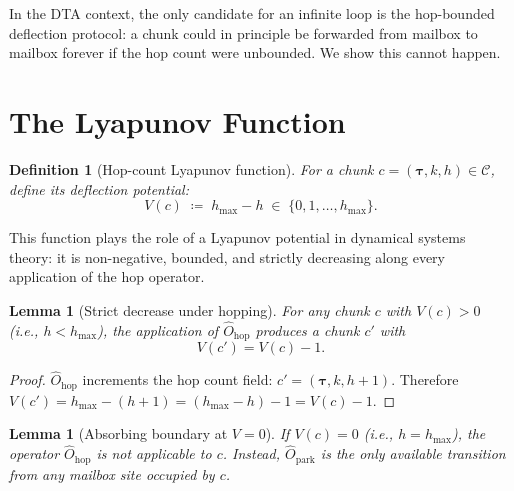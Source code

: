 \documentclass[11pt,a4paper]{report}
\newtheorem{lemma}[theorem]{Lemma}
\newtheorem{definition}{Definition}[section]
\begin{document}
In the DTA context, the only candidate for an infinite loop is the
hop-bounded deflection protocol: a chunk could in principle be
forwarded from mailbox to mailbox forever if the hop count were
unbounded.  We show this cannot happen.

\section{The Lyapunov Function}

\begin{definition}[Hop-count Lyapunov function]
\label{def:lyapunov}
For a chunk $c = (\bm{\tau}, k, h) \in \mathcal{C}$, define its
\emph{deflection potential}:
\[
  V(c) \;\coloneqq\; h_{\max} - h \;\in\; \{0, 1, \ldots, h_{\max}\}.
\]
\end{definition}

This function plays the role of a Lyapunov potential in dynamical
systems theory: it is non-negative, bounded, and strictly
decreasing along every application of the hop operator.

\begin{lemma}[Strict decrease under hopping]
\label{lem:decrease}
For any chunk $c$ with $V(c) > 0$ (i.e., $h < h_{\max}$), the
application of $\hat{O}_{\text{hop}}$ produces a chunk $c'$ with
\[
  V(c') = V(c) - 1.
\]
\end{lemma}

\begin{proof}
$\hat{O}_{\text{hop}}$ increments the hop count field:
$c' = (\bm{\tau}, k, h+1)$.  Therefore
$V(c') = h_{\max} - (h+1) = (h_{\max} - h) - 1 = V(c) - 1$.
\end{proof}

\begin{lemma}[Absorbing boundary at $V = 0$]
\label{lem:absorb}
If $V(c) = 0$ (i.e., $h = h_{\max}$), the operator
$\hat{O}_{\text{hop}}$ is not applicable to $c$.
Instead, $\hat{O}_{\text{park}}$ is the only available transition
from any mailbox site occupied by $c$.
\end{lemma}
\end{document}
